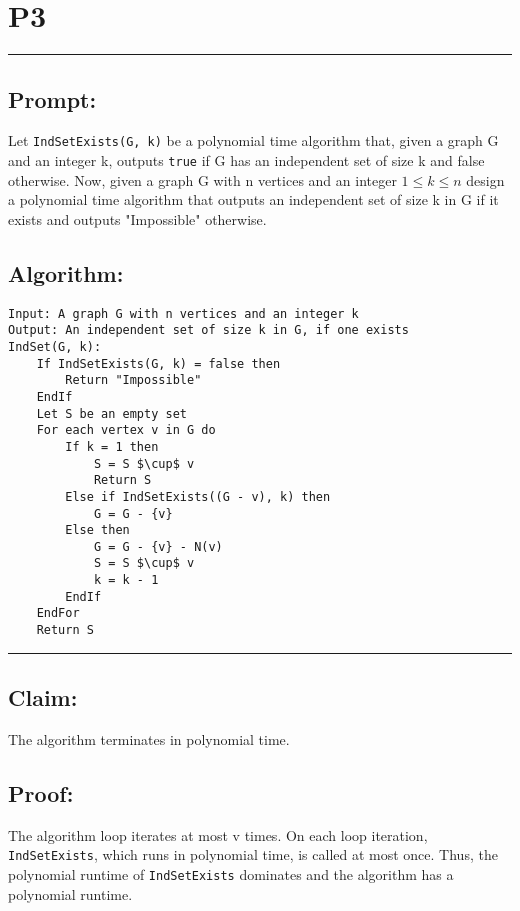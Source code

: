 \documentclass[11pt]{article}
\title{}
\author{}
\date{}
\begin{document}
\section*{P3}

\noindent\textcolor[RGB]{220,220,220}{\rule{\linewidth}{0.8pt}}

\subsection*{Prompt:} 

Let \lstinline{IndSetExists(G, k)} be a polynomial time algorithm that, given a graph G and an integer k, outputs \lstinline{true} if G has an independent set of size k and false otherwise. Now, given a graph G with n vertices and an integer $1 \leq k \leq n$ design a polynomial time algorithm that outputs an independent set of size k in G if it exists and outputs "Impossible" otherwise.

\subsection*{Algorithm:}


\begin{lstlisting}[basicstyle=\small, mathescape=true]
Input: A graph G with n vertices and an integer k
Output: An independent set of size k in G, if one exists
IndSet(G, k):
	If IndSetExists(G, k) = false then
		Return "Impossible"
	EndIf
	Let S be an empty set
	For each vertex v in G do 
		If k = 1 then
			S = S $\cup$ v
			Return S
		Else if IndSetExists((G - v), k) then
			G = G - {v}
		Else then
			G = G - {v} - N(v)
			S = S $\cup$ v
			k = k - 1
		EndIf
	EndFor
	Return S
\end{lstlisting}

\noindent\textcolor[RGB]{220,220,220}{\rule{\linewidth}{0.8pt}}
\linebreak

\subsection*{Claim:}

The algorithm terminates in polynomial time.

\subsection*{Proof:}

The algorithm loop iterates at most v times. On each loop iteration, \lstinline{IndSetExists}, which runs in polynomial time, is called at most once. Thus, the polynomial runtime of \lstinline{IndSetExists} dominates and the algorithm has a polynomial runtime.
\end{document}

